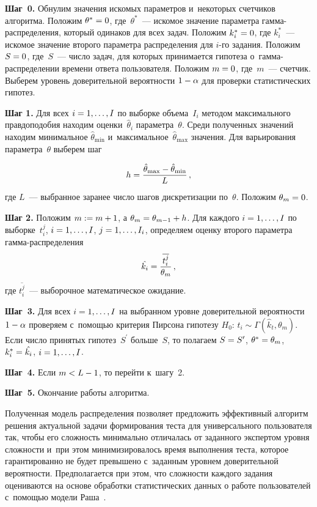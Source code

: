 \begin{multicols}{2}
   \textbf{Шаг~0.} Обнулим значения искомых па\-ра\-мет\-ров и~некоторых счетчиков 
алгоритма. Положим $\theta^*\hm=0$, где~$\theta^*$~--- искомое значение 
параметра гам\-ма-рас\-пре\-де\-ле\-ния, который одинаков для всех задач. 
Положим $k_i^*\hm=0$, где $k_i^*$~--- искомое значение второго параметра 
распределения для $i$-го задания. Положим $S\hm=0$, где~$S$~--- число задач, 
для которых принимается гипотеза о~гам\-ма-рас\-пре\-де\-ле\-нии времени 
ответа пользователя. Положим $m\hm=0$, где~$m$~--- счетчик. Выберем 
уровень доверительной вероятности $1\hm-\alpha$ для проверки 
статистических гипотез.
    
    \textbf{Шаг 1.} Для всех $i\hm=1,\ldots , I$ по выборке объема~$I_i$ методом 
максимального правдоподобия находим оценки~$\hat{\theta}_i$ 
параметра~$\theta$. Среди полученных значений находим минимальное 
$\hat{\theta}_{\min}$ и~максимальное~$\hat{\theta}_{\max}$ значения. Для 
варьирования параметра~$\theta$ выберем шаг 

\noindent
    $$
    h=\displaystyle\frac{\displaystyle \hat{\theta}_{\max}-\hat{\theta}_{\min}\mathstrut}{\displaystyle L\mathstrut}\,,
    $$
где $L$~--- выбранное заранее число шагов дискретизации по~$\theta$. 
Положим $\theta_m\hm=0$.
    
    \textbf{Шаг 2.} Положим $m:=m\hm+1$, а $\theta_m\hm= \theta_{m-1}\hm+h$. Для 
каждого $i\hm= 1,\ldots , I$ по выборке~$t_i^j$, $i\hm=1,\ldots , I$,
 $j\hm= 1,\ldots , I_i$, определяем оценку второго параметра 
 гам\-ма-рас\-пре\-де\-ления
    $$
    \hat{k_i} =\displaystyle\frac{\displaystyle \overline{t_i^j}\mathstrut}{\displaystyle \theta_m\mathstrut}\,,
    $$
где $\overline{t_i^j}$~--- выборочное математическое ожидание.
    
    \textbf{Шаг~3.} Для всех $i\hm=1,\ldots , I$ на выбранном уровне доверительной 
вероятности $1\hm-\alpha$ проверяем с~помощью критерия Пирсона гипотезу  
$H_0$: $t_i\sim \Gamma(\hat{k}_t, \theta_m)$.
Если число принятых гипотез~$S^\prime$ больше~$S$, то полагаем $S\hm= 
S^\prime$, $\theta^*\hm= \theta_m$, $k_i^*\hm= \hat{k_i}$, $i\hm= 1,\ldots , I$.
    
    \textbf{Шаг~4.} Если $m<L\hm-1$, то перейти к~шагу~2.
    
    \textbf{Шаг~5.} Окончание работы алгоритма.
    
    Полученная модель распределения позволяет предложить эффективный 
алгоритм решения актуальной задачи формирования теста для универсального 
пользователя так, чтобы его сложность минимально отличалась от заданного 
экспертом уровня сложности и~при этом минимизировалось время выполнения 
теста, которое гарантированно не будет превышено с~заданным уровнем 
доверительной вероятности. Предполагается при этом, что сложности каждого 
задания оцениваются на основе обработки статистических данных о работе 
пользователей с~помощью модели Раша~\cite{3-b}. 


\end{multicols}
